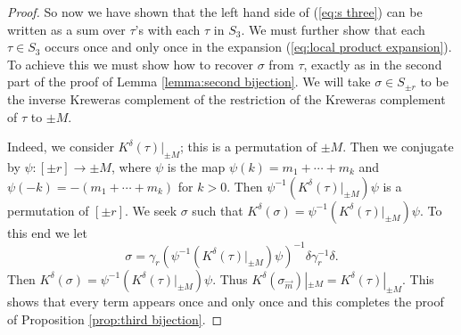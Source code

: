 \documentclass[11pt]{amsart}
\theoremstyle{definition}
\numberwithin{theorem}{section}
\newcommand{\vm}{{\vec{m}}}
\begin{document}
\begin{proof}
So now we have shown that the left hand side of (\ref{eq:s
  three}) can be written as a sum over $\tau$'s with each
$\tau$ in $S_3$. We must further show that each $\tau \in
S_3$ occurs once and only once in the expansion
(\ref{eq:local product expansion}). To achieve this we must
show how to recover $\sigma$ from $\tau$, exactly as in the
second part of the proof of Lemma \ref{lemma:second
  bijection}. We will take $\sigma \in S_{\pm r}$ to be the
inverse Kreweras complement of the restriction of the
Kreweras complement of $\tau$ to $\pm M$.

Indeed, we consider $K^\delta(\tau)|_{\pm M}$; this is a
permutation of $\pm M$. Then we conjugate by $\psi:[\pm r]
\rightarrow \pm M$, where $\psi$ is the map $\psi(k) = m_1 +
\cdots + m_k$ and $\psi(-k) = -(m_1 + \cdots + m_k)$ for $k
> 0$. Then $\psi^{-1} (K^\delta(\tau)|_{\pm M}) \psi$ is a
permutation of $[\pm r]$. We seek $\sigma$ such that
$K^\delta(\sigma) = \psi^{-1} (K^\delta(\tau)|_{\pm M})
\psi$. To this end we let
\[
\sigma =  \gamma_r (\psi^{-1} (K^\delta(\tau)|_{\pm M}) \psi)^{-1} \delta \gamma_r^{-1}\delta.  
\]
Then $K^\delta(\sigma) = \psi^{-1} (K^\delta(\tau)|_{\pm M})
\psi$. Thus $K^\delta(\sigma_\vm) |_{\pm M} =
K^\delta(\tau)|_{\pm M}$.  This shows that every term
appears once and only once and this completes the proof of
Proposition \ref{prop:third bijection}. \end{proof}
\end{document}
